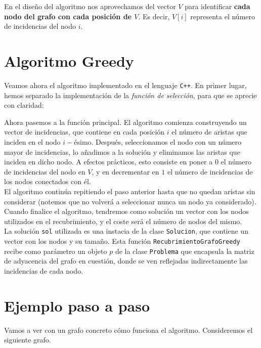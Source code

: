 \documentclass[11pt]{article}
\begin{document}
En el diseño del algoritmo nos aprovechamos del vector $V$ para identificar \textbf{cada nodo del grafo con cada posición de $V$}. Es decir, $V[i]$ representa el número de incidencias del nodo $i$.

\section*{Algoritmo Greedy}

Veamos ahora el algoritmo implementado en el lenguaje \verb|C++|. En primer lugar, hemos separado la implementación de la \textit{función de selección}, para que se aprecie con claridad:

	
\vspace{1em}

Ahora pasemos a la función principal. El algoritmo comienza construyendo un vector de incidencias, que contiene en cada posición $i$ el número de aristas que inciden en el nodo $i-$ésimo. Después, seleccionamos el nodo con un número mayor de incidencias, lo añadimos a la solución y eliminamos las aristas que inciden en dicho nodo. A efectos prácticos, esto consiste en poner a $0$ el número de incidencias del nodo en $V$, y en decrementar en $1$ el número de incidencias de los nodos conectados con él.\\


El algoritmo continúa repitiendo el paso anterior hasta que no quedan aristas sin considerar (notemos que no volverá a seleccionar nunca un nodo ya considerado). Cuando finalice el algoritmo, tendremos como solución un vector con los nodos utilizados en el recubrimiento, y el coste será el número de nodos del mismo.\\



La solución \verb|sol| utilizada es una instacia de la clase \verb|Solucion|, que contiene un vector con los nodos y su tamaño. Esta función \verb|RecubrimientoGrafoGreedy| recibe como parámetro un objeto $p$ de la clase \verb|Problema| que encapsula la matriz de adyacencia del grafo en cuestión, donde se ven reflejadas indirectamente las incidencias de cada nodo.

\section*{Ejemplo paso a paso}
Vamos a ver con un grafo concreto cómo funciona el algoritmo. Consideremos el siguiente grafo.
\end{document}
